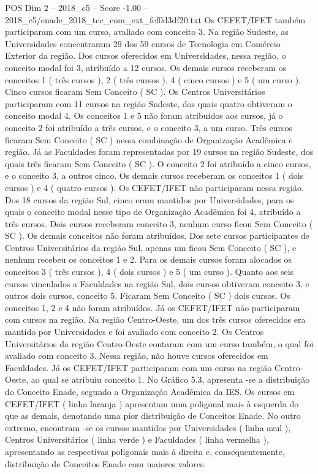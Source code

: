 \begin{textsample}{POS Dim 2 – 2018\_c5 – Score -1.00 – 2018\_c5/enade\_2018\_tec\_com\_ext\_fef0d3df20.txt}
Os CEFET/IFET também participaram com um curso, avaliado com conceito 3.
Na região Sudeste, as Universidades concentraram 29 dos 59 cursos de Tecnologia em Comércio Exterior da região.
Dos cursos oferecidos em Universidades, nessa região, o conceito modal foi 3, atribuído a 12 cursos.
Os demais cursos receberam os conceitos 1 ( três cursos ), 2 ( três cursos ), 4 ( cinco cursos ) e 5 ( um curso ).
Cinco cursos ficaram Sem Conceito ( SC ).
Os Centros Universitários participaram com 11 cursos na região Sudeste, dos quais quatro obtiveram o conceito modal 4.
Os conceitos 1 e 5 não foram atribuídos aos cursos, já o conceito 2 foi atribuído a três cursos, e o conceito 3, a um curso.
Três cursos ficaram Sem Conceito ( SC ) nessa combinação de Organização Acadêmica e região.
Já as Faculdades foram representadas por 19 cursos na região Sudeste, dos quais três ficaram Sem Conceito ( SC ).
O conceito 2 foi atribuído a cinco cursos, e o conceito 3, a outros cinco.
Os demais cursos receberam os conceitos 1 ( dois cursos ) e 4 ( quatro cursos ).
Os CEFET/IFET não participaram nessa região.
Dos 18 cursos da região Sul, cinco eram mantidos por Universidades, para os quais o conceito modal nesse tipo de Organização Acadêmica foi 4, atribuído a três cursos.
Dois cursos receberam conceito 3, nenhum curso ficou Sem Conceito ( SC ).
Os demais conceitos não foram atribuídos.
Dos sete cursos participantes de Centros Universitários da região Sul, apenas um ficou Sem Conceito ( SC ), e nenhum recebeu os conceitos 1 e 2.
Para os demais cursos foram alocados os conceitos 3 ( três cursos ), 4 ( dois cursos ) e 5 ( um curso ).
Quanto aos seis cursos vinculados a Faculdades na região Sul, dois cursos obtiveram conceito 3, e outros dois cursos, conceito 5.
Ficaram Sem Conceito ( SC ) dois cursos.
Os conceitos 1, 2 e 4 não foram atribuídos.
Já os CEFET/IFET não participaram com cursos na região.
Na região Centro-Oeste, um dos três cursos oferecidos era mantido por Universidades e foi avaliado com conceito 2.
Os Centros Universitários da região Centro-Oeste contaram com um curso também, o qual foi avaliado com conceito 3.
Nessa região, não houve cursos oferecidos em Faculdades.
Já os CEFET/IFET participaram com um curso na região Centro-Oeste, ao qual se atribuiu conceito 1.
No Gráfico 5.3, apresenta -se a distribuição do Conceito Enade, segundo a Organização Acadêmica da IES.
Os cursos em CEFET/IFET ( linha laranja ) apresentam uma poligonal mais à esquerda do que as demais, denotando uma pior distribuição de Conceitos Enade.
No outro extremo, encontram -se os cursos mantidos por Universidades ( linha azul ), Centros Universitários ( linha verde ) e Faculdades ( linha vermelha ), apresentando as respectivas poligonais mais à direita e, consequentemente, distribuição de Conceitos Enade com maiores valores.

\end{textsample}
